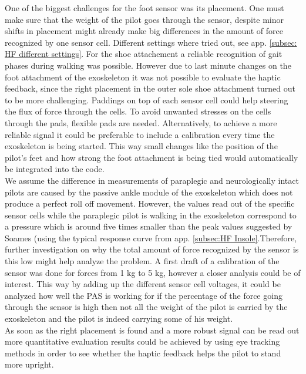 \documentclass[conference,a4paper]{IEEEtran}
\begin{document}
One of the biggest challenges for the foot sensor was its placement. One must make sure that the weight of the pilot goes through the sensor, despite minor shifts in placement might already make big differences in the amount of force recognized by one sensor cell. Different settings where tried out, see app. \ref{subsec: HF different settings}. For the shoe attachement a reliable recognition of gait phases during walking was possible. However due to last minute changes on the foot attachment of the exoskeleton it was not possible to evaluate the haptic feedback, since the right placement in the outer sole shoe attachment turned out to be more challenging. Paddings on top of each sensor cell could help steering the flux of force through the cells. To avoid unwanted stresses on the cells through the pads, flexible pads are needed. Alternatively, to achieve a more reliable signal it could be preferable to include a calibration every time the exoskeleton is being started. This way small changes like the position of the pilot's feet and how strong the foot attachment is being tied would automatically be integrated into the code.  \\
We assume the difference in measurements of paraplegic and neurologically intact pilots are caused by the passive ankle module of the exoskeleton which does not produce a perfect roll off movement. However, the values read out of the specific sensor cells while the paraplegic pilot is walking in the exoskeleton correspond to a pressure which is around five times smaller than the peak values suggested by Soames \cite{soames1985foot} (using the typical response curve from app. \ref{subsec:HF Insole}.Therefore, further investigation on why the total amount of force recognized by the sensor is this low might help analyze the problem. A first draft of a calibration of the sensor was done for forces from 1 kg to 5 kg, however a closer analysis could be of interest. This way by adding up the different sensor cell voltages, it could be analyzed how well the PAS is working for if the percentage of the force going through the sensor is high then not all the weight of the pilot is carried by the exoskeleton and the pilot is indeed carrying some of his weight. \\


As soon as the right placement is found and a more robust signal can be read out more quantitative evaluation results could be achieved by using eye tracking methods in order to see whether the haptic feedback helps the pilot to stand more upright.\\ 
\end{document}
